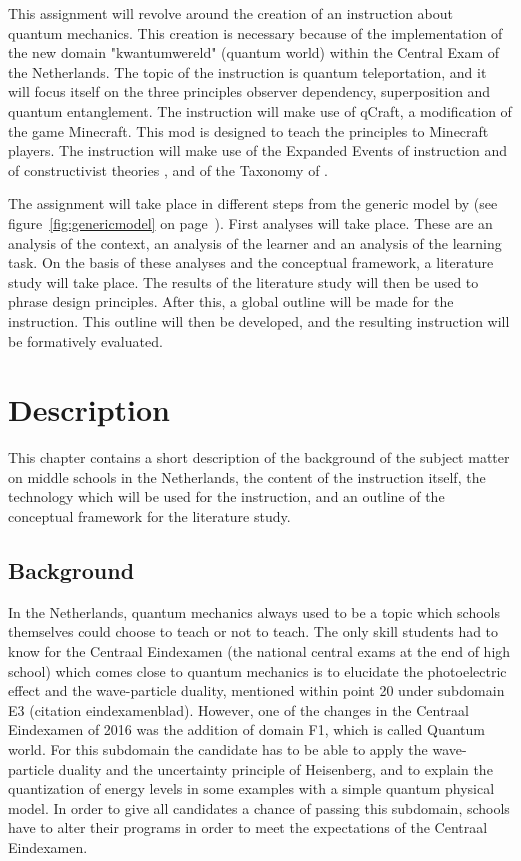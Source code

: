 \documentclass[12pt]{report} %
\begin{document}
This assignment will revolve around the creation of an instruction about quantum mechanics. This creation is necessary because of the implementation of the new domain "kwantumwereld" (quantum world) within the Central Exam of the Netherlands. The topic of the instruction is quantum teleportation, and it will focus itself on the three principles observer dependency, superposition and quantum entanglement. The instruction will make use of qCraft, a modification of the game Minecraft. This mod is designed to teach the principles to Minecraft players. The instruction will make use of the Expanded Events of instruction and of constructivist theories \cite{smithragan}, and of the Taxonomy of .

The assignment will take place in different steps from the generic model by  (see figure~\ref{fig:genericmodel} on page~\pageref{fig:genericmodel}). First analyses will take place. These are an analysis of the context, an analysis of the learner and an analysis of the learning task. On the basis of these analyses and the conceptual framework, a literature study will take place. The results of the literature study will then be used to phrase design principles. After this, a global outline will be made for the instruction. This outline will then be developed, and the resulting instruction will be formatively evaluated.

\chapter{Description}

This chapter contains a short description of the background of the subject matter on middle schools in the Netherlands, the content of the instruction itself, the technology which will be used for the instruction, and an outline of the conceptual framework for the literature study.

\section{Background}

In the Netherlands, quantum mechanics always used to be a topic which schools themselves could choose to teach or not to teach. The only skill students had to know for the Centraal Eindexamen (the national central exams at the end of high school) which comes close to quantum mechanics is to elucidate the photoelectric effect and the wave-particle duality, mentioned within point 20 under subdomain E3 (citation eindexamenblad). However, one of the changes in the Centraal Eindexamen of 2016 was the addition of domain F1, which is called Quantum world. For this subdomain the candidate has to be able to apply the wave-particle duality and the uncertainty principle of Heisenberg, and to explain the quantization of energy levels in some examples with a simple quantum physical model. In order to give all candidates a chance of passing this subdomain, schools have to alter their programs in order to meet the expectations of the Centraal Eindexamen.
\end{document}
